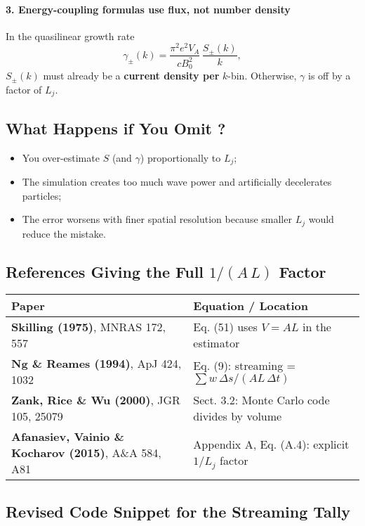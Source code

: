 \paragraph{3. Energy-coupling formulas use flux, not number density}
In the quasilinear growth rate
\[
\gamma_\pm(k) = \frac{\pi^2 e^2 V_A}{c B_0^2}\,\frac{S_\pm(k)}{k},
\]
$S_\pm(k)$ must already be a \textbf{current density per} $k$-bin. Otherwise, $\gamma$ is off by a factor of $L_j$.

\subsection*{What Happens if You Omit ?}
\begin{itemize}
  \item You over-estimate $S$ (and $\gamma$) proportionally to $L_j$;
  \item The simulation creates too much wave power and artificially decelerates particles;
  \item The error worsens with finer spatial resolution because smaller $L_j$ would reduce the mistake.
\end{itemize}

\subsection*{References Giving the Full $1/(A\,L)$ Factor}

\begin{tabular}{@{}p{9cm}p{6cm}@{}}
\toprule
\textbf{Paper} & \textbf{Equation / Location} \\
\midrule
\textbf{Skilling (1975)}, MNRAS 172, 557 & Eq. (51) uses $V = A L$ in the estimator \\
\textbf{Ng \& Reames (1994)}, ApJ 424, 1032 & Eq. (9): streaming = $\sum w\,\Delta s / (A L\,\Delta t)$ \\
\textbf{Zank, Rice \& Wu (2000)}, JGR 105, 25079 & Sect. 3.2: Monte Carlo code divides by volume \\
\textbf{Afanasiev, Vainio \& Kocharov (2015)}, A\&A 584, A81 & Appendix A, Eq. (A.4): explicit $1/L_j$ factor \\
\bottomrule
\end{tabular}

\subsection*{Revised Code Snippet for the Streaming Tally}

